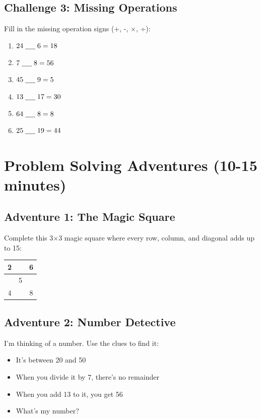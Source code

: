 \documentclass{article}
\begin{document}
\subsection*{Challenge 3: Missing Operations}
Fill in the missing operation signs (+, -, ×, ÷):

\begin{enumerate}
    \item $24 \; \underline{\hspace{0.5cm}} \; 6 = 18$
    \item $7 \; \underline{\hspace{0.5cm}} \; 8 = 56$
    \item $45 \; \underline{\hspace{0.5cm}} \; 9 = 5$
    \item $13 \; \underline{\hspace{0.5cm}} \; 17 = 30$
    \item $64 \; \underline{\hspace{0.5cm}} \; 8 = 8$
    \item $25 \; \underline{\hspace{0.5cm}} \; 19 = 44$
\end{enumerate}

\section{Problem Solving Adventures (10-15 minutes)}

\subsection*{Adventure 1: The Magic Square}
Complete this 3×3 magic square where every row, column, and diagonal adds up to 15:

\begin{center}
\begin{tabular}{|c|c|c|}
\hline
2 & & 6 \\
\hline
& 5 & \\
\hline
4 & & 8 \\
\hline
\end{tabular}
\end{center}

\subsection*{Adventure 2: Number Detective}
I'm thinking of a number. Use the clues to find it:
\begin{itemize}
    \item It's between 20 and 50
    \item When you divide it by 7, there's no remainder
    \item When you add 13 to it, you get 56
    \item What's my number? \underline{\hspace{3cm}}
\end{itemize}
\end{document}
